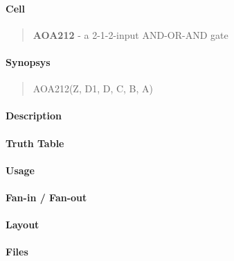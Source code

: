 \label{AOA212}
\paragraph{Cell}
\begin{quote}
    \textbf{AOA212} - a 2-1-2-input AND-OR-AND gate
\end{quote}

\paragraph{Synopsys}
\begin{quote}
    AOA212(Z, D1, D, C, B, A)
\end{quote}

\paragraph{Description}

%

\paragraph{Truth Table}
%

\paragraph{Usage}

\paragraph{Fan-in / Fan-out}

\paragraph{Layout}

\paragraph{Files}
